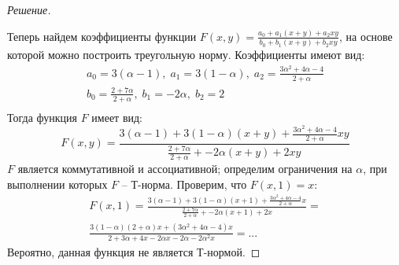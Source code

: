 \documentclass[11pt,a4paper,oneside]{article}
\newenvironment{solution}{
	\begin{proof}[Решение]
		\vspace{-8px}
		\setlength{\parskip}{4px}
		\setlength{\parindent}{0px}
	}{
	\end{proof}
}
\begin{document}
\begin{solution}
\begin{figure}[!hbtp]
		 	\label{fig:decr}
		 \end{figure}
	 \newline
	 Теперь найдем коэффициенты функции $ F(x,y) = \frac{a_0 + a_1(x+y) + a_2xy}{b_0 + b_1(x+y) + b_2xy} $, на основе которой можно построить треугольную норму. Коэффициенты имеют вид:
	 \begin{gather*}
	 a_0 = 3(\alpha-1),\;a_1 = 3(1-\alpha),\;a_2 = \frac{3\alpha^2 + 4\alpha - 4}{2+\alpha} \\
	 b_0 = \frac{2+7\alpha}{2+\alpha},\;b_1 = -2\alpha,\;b_2 = 2 \\
	 \end{gather*}
	 Тогда функция $F$ имеет вид:
	 \[
	 	F(x,y) = \frac{3(\alpha-1) + 3(1-\alpha)(x+y) + \frac{3\alpha^2 + 4\alpha - 4}{2+\alpha}xy}{\frac{2+7\alpha}{2+\alpha} + -2\alpha(x+y) + 2xy}
	 \]
	 $F$ является коммутативной и ассоциативной; определим ограничения на $\alpha$, при выполнении которых $F$ -- Т-норма.
	 \newline
	 Проверим, что $F(x,1) = x$:
	 \begin{gather*}
	 F(x,1) = \frac{3(\alpha-1) + 3(1-\alpha)(x+1) + \frac{3\alpha^2 + 4\alpha - 4}{2+\alpha}x}{\frac{2+7\alpha}{2+\alpha} + -2\alpha(x+1) + 2x} = \\
	 \frac{3(1-\alpha)(2+\alpha)x + (3\alpha^2 + 4\alpha-4)x}{ 2 + 3\alpha +4x - 2\alpha x-2\alpha -2\alpha^2x } = ...
	 \end{gather*}
	 Вероятно, данная функция не является Т-нормой.
	\end{solution}
\end{document}

